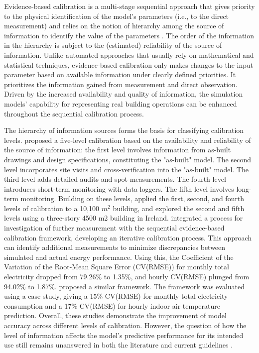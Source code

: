 \documentclass[3p,times,12pt]{elsarticle}
\begin{document}
\begin{sloppypar}
Evidence-based calibration is a multi-stage sequential approach that gives priority to the physical identification of the model’s parameters (i.e., to the direct measurement) and relies on the notion of hierarchy among the source of information to identify the value of the parameters \cite{bertagnolio2012evidence}. The order of the information in the hierarchy is subject to the (estimated) reliability of the source of information. Unlike automated approaches that usually rely on mathematical and statistical techniques, evidence-based calibration only makes changes to the input parameter based on available information under clearly defined priorities. It prioritizes the information gained from measurement and direct observation. Driven by the increased availability and quality of information, the simulation models' capability for representing real building operations can be enhanced throughout the sequential calibration process.

The hierarchy of information sources forms the basis for classifying calibration levels. \citet{reddy2006literature} proposed a five-level calibration based on the availability and reliability of the source of information: the first level involves information from as-built drawings and design specifications, constituting the "as-built" model. The second level incorporates site visits and cross-verification into the "as-built" model. The third level adds detailed audits and spot measurements. The fourth level introduces short-term monitoring with data loggers. The fifth level involves long-term monitoring. Building on these levels, \citet{bertagnolio2012evidence} applied the first, second, and fourth levels of calibration to a 10,100 $m^2$ building, and \citet{mustafaraj2014model} explored the second and fifth levels using a three-story 4500 m2 building in Ireland. \citet{raftery2011evidence} integrated a process for investigation of further measurement with the sequential evidence-based calibration framework, developing an iterative calibration process. This approach can identify additional measurements to minimize discrepancies between simulated and actual energy performance. Using this, the Coefficient of the Variation of the Root-Mean Square Error (CV(RMSE)) for monthly total electricity dropped from 79.26\% to 1.35\%, and hourly CV(RMSE) plunged from 94.02\% to 1.87\%. \citet{zuhaib2019application} proposed a similar framework. The framework was evaluated using a case study, giving a 15\% CV(RMSE) for monthly total electricity consumption and a 17\% CV(RMSE) for hourly indoor air temperature prediction. Overall, these studies demonstrate the improvement of model accuracy across different levels of calibration. However, the question of how the level of information affects the model's predictive performance for its intended use still remains unanswered in both the literature and current guidelines \cite{guideline200214, united2001international, femp2015m}. 


\end{sloppypar}
\end{document}
